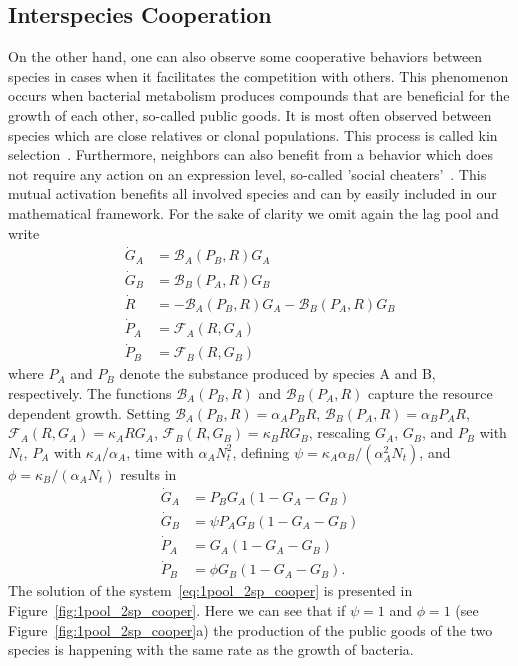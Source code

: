 \documentclass[10pt,twocolumn,5p]{elsarticle}
\numberwithin{equation}{section}
\begin{document}
\subsection{Interspecies Cooperation}
On the other hand, one can also observe some cooperative behaviors between species in cases when it facilitates the competition with others.
This phenomenon occurs when bacterial metabolism produces compounds that are beneficial for the growth of each other, so-called public goods.
It is most often observed between species which are close relatives or clonal populations.
This process is called kin selection~\cite{west_social_2007}.
Furthermore, neighbors can also benefit from a behavior which does not require any action on an expression level, so-called 'social cheaters'~\cite{rainey_evolution_2003}.
This mutual activation benefits all involved species and can by easily included in our mathematical framework.
For the sake of clarity we omit again the lag pool and write
\begin{align}
    \dot{G}_A &= \mathcal{B}_A(P_B,R)G_A\\
    \dot{G}_B &= \mathcal{B}_B(P_A,R)G_B\\
    \dot{R} &=-\mathcal{B}_A(P_B,R)G_A-\mathcal{B}_B(P_A,R)G_B\\
    \dot{P}_A &= \mathcal{F}_A(R,G_A)\\
    \dot{P}_B &= \mathcal{F}_B(R,G_B)
\end{align}
where $P_A$ and $P_B$ denote the substance produced by species A and B, respectively.
The functions $\mathcal{B}_A(P_B,R)$ and $\mathcal{B}_B(P_A,R)$ capture the resource dependent growth.
Setting $\mathcal{B}_A(P_B,R)=\alpha_A P_BR$, $\mathcal{B}_B(P_A,R)=\alpha_B P_A R$, $\mathcal{F}_A(R,G_A)=\kappa_A RG_A$, $\mathcal{F}_B(R,G_B)=\kappa_B RG_B$, rescaling $G_A$, $G_B$, and $P_B$ with $N_t$, $P_A$ with $\kappa_A/\alpha_A$, time with $\alpha_AN_t^2$, defining $\psi=\kappa_A\alpha_B/(\alpha_A^2N_t)$, and $\phi=\kappa_B/(\alpha_A N_t)$ results in
\begin{align}
    \dot{G}_A &= P_B G_A\left(1 - G_A-G_B\right)\\
    \dot{G}_B &= \psi P_A G_B\left(1 - G_A-G_B\right)\\
    \dot{P}_A &= G_A\left(1 - G_A-G_B\right)\\
    \dot{P}_B &=\phi G_B\left(1 - G_A-G_B\right).
    \label{eq:1pool_2sp_cooper}
\end{align}
%
The solution of the system~\ref{eq:1pool_2sp_cooper} is presented in Figure~\ref{fig:1pool_2sp_cooper}.
Here we can see that if $\psi=1$ and $\phi=1$ (see Figure~\ref{fig:1pool_2sp_cooper}a) the production of the public goods of the two species is happening with the same rate as the growth of bacteria.
\end{document}
